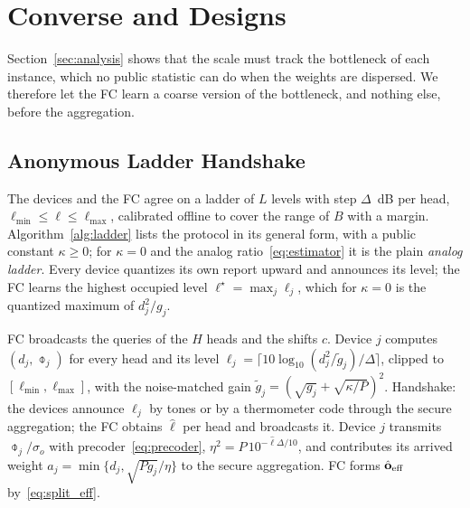 \section{Converse and Designs}
\label{sec:design}

Section~\ref{sec:analysis} shows that the scale must track the bottleneck of each instance, which no public statistic can do when the weights are dispersed. We therefore let the FC learn a coarse version of the bottleneck, and nothing else, before the aggregation.

\subsection{Anonymous Ladder Handshake}

The devices and the FC agree on a ladder of $L$ levels with step $\Delta$~dB per head, $\ell_{\min}\le\ell\le\ell_{\max}$, calibrated offline to cover the range of $B$ with a margin. Algorithm~\ref{alg:ladder} lists the protocol in its general form, with a public constant $\kappa\ge0$; for $\kappa=0$ and the analog ratio~\eqref{eq:estimator} it is the plain \emph{analog ladder}. Every device quantizes its own report upward and announces its level; the FC learns the highest occupied level $\ell^\star=\max_j\ell_j$, which for $\kappa=0$ is the quantized maximum of $d_j^2/g_j$.

\begin{algorithm}[t]
\caption{Proposed protocol (one layer)}
\label{alg:ladder}
\begin{algorithmic}[1]
\State FC broadcasts the queries of the $H$ heads and the shifts $c$.
\State Device $j$ computes $(d_j,\obar_j)$ for every head and its level $\ell_j=\lceil 10\log_{10}(d_j^2/\tilde g_j)/\Delta\rceil$, clipped to $[\ell_{\min},\ell_{\max}]$, with the noise-matched gain $\tilde g_j=(\sqrt{g_j}+\sqrt{\kappa/P})^2$.
\State Handshake: the devices announce $\ell_j$ by tones or by a thermometer code through the secure aggregation; the FC obtains $\hat\ell$ per head and broadcasts it.
\State Device $j$ transmits $\obar_j/\sigma_o$ with precoder~\eqref{eq:precoder}, $\eta^2=P\,10^{-\hat\ell\Delta/10}$, and contributes its arrived weight $a_j=\min\{d_j,\sqrt{Pg_j}/\eta\}$ to the secure aggregation.
\State FC forms $\hat{\mathbf{o}}_{\rm eff}$ by~\eqref{eq:split_eff}.
\end{algorithmic}
\end{algorithm}

